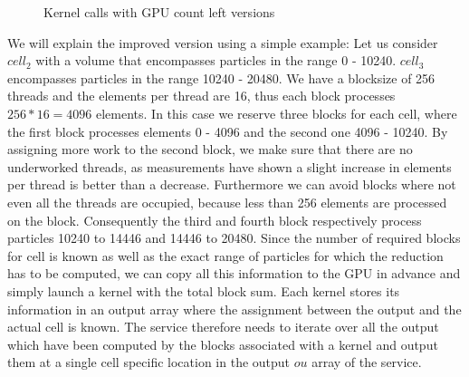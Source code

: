 \documentclass[]{article}
\begin{document}
\begin{figure}[H]
	\begin{center}
		\caption{Kernel calls with GPU count left versions}
		\label{fig:degrading}
	\end{center}
\end{figure}

We will explain the improved version using a simple example: Let us consider $cell_2$ with a volume that encompasses particles in the range 0 - 10240. $cell_3$ encompasses particles in the range 10240 - 20480. We have a blocksize of 256 threads and the elements per thread are 16, thus each block processes $256 * 16 = 4096$ elements. In this case we reserve three blocks for each cell, where the first block processes elements 0 - 4096 and the second one 4096 - 10240. By assigning more work to the second block, we make sure that there are no underworked threads, as measurements have shown a slight increase in elements per thread is better than a decrease. Furthermore we can avoid blocks where not even all the threads are occupied, because less than 256 elements are processed on the block. Consequently the third and fourth block respectively process particles 10240 to 14446 and 14446 to 20480. Since the number of required blocks for cell is known as well as the exact range of particles for which the reduction has to be computed, we can copy all this information to the GPU in advance and simply launch a kernel with the total block sum. 
Each kernel stores its information in an output array where the assignment between the output and the actual cell is known. The service therefore needs to iterate over all the output which have been computed by the blocks associated with a kernel and output them at a single cell specific location in the output $ou$ array of the service.
\end{document}
